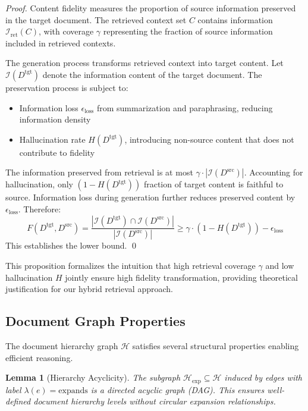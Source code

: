 \documentclass{ieeeaccess}
\newtheorem{lemma}[theorem]{Lemma}
\begin{document}
\begin{proof}
Content fidelity measures the proportion of source information preserved in the target document. The retrieved context set \(C\) contains information \(\mathcal{I}_{\text{ret}}(C)\), with coverage \(\gamma\) representing the fraction of source information included in retrieved contexts.

The generation process transforms retrieved context into target content. Let \(\mathcal{I}(D^{\text{tgt}})\) denote the information content of the target document. The preservation process is subject to:
\begin{itemize}
\item Information loss \(\epsilon_{\text{loss}}\) from summarization and paraphrasing, reducing information density
\item Hallucination rate \(H(D^{\text{tgt}})\), introducing non-source content that does not contribute to fidelity
\end{itemize}

The information preserved from retrieval is at most \(\gamma \cdot |\mathcal{I}(D^{\text{src}})|\). Accounting for hallucination, only \((1 - H(D^{\text{tgt}}))\) fraction of target content is faithful to source. Information loss during generation further reduces preserved content by \(\epsilon_{\text{loss}}\). Therefore:
\[
F(D^{\text{tgt}}, D^{\text{src}}) = \frac{|\mathcal{I}(D^{\text{tgt}}) \cap \mathcal{I}(D^{\text{src}})|}{|\mathcal{I}(D^{\text{src}})|} \geq \gamma \cdot (1 - H(D^{\text{tgt}})) - \epsilon_{\text{loss}}
\]
This establishes the lower bound. \qed
\end{proof}

This proposition formalizes the intuition that high retrieval coverage \(\gamma\) and low hallucination \(H\) jointly ensure high fidelity transformation, providing theoretical justification for our hybrid retrieval approach.

\subsection{Document Graph Properties}

The document hierarchy graph \(\mathcal{H}\) satisfies several structural properties enabling efficient reasoning.

\begin{lemma}[Hierarchy Acyclicity]
The subgraph \(\mathcal{H}_{\text{exp}} \subseteq \mathcal{H}\) induced by edges with label \(\lambda(e) = \text{expands}\) is a directed acyclic graph (DAG). This ensures well-defined document hierarchy levels without circular expansion relationships.
\end{lemma}
\end{document}
